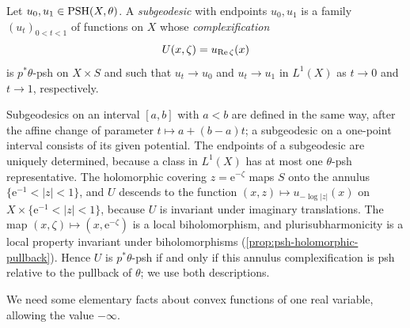 \begin{definition}\label{def:relative-subgeodesic}
Let $u_0,u_1\in\mathrm{PSH}(X,\theta)$. A \emph{subgeodesic} with endpoints $u_0,u_1$ is a family $(u_t)_{0<t<1}$ of functions on $X$ whose \emph{complexification}
\[
 U(x,\zeta)=u_{\operatorname{Re}\zeta}(x)
\]
is $p^*\theta$-psh on $X\times S$ and such that $u_t\to u_0$ and $u_t\to u_1$ in $L^1(X)$ as $t\to0$ and $t\to1$, respectively.
\end{definition}
Subgeodesics on an interval $[a,b]$ with $a<b$ are defined in the same way, after the affine change of parameter $t\mapsto a+(b-a)t$; a subgeodesic on a one-point interval consists of its given potential. The endpoints of a subgeodesic are uniquely determined, because a class in $L^1(X)$ has at most one $\theta$-psh representative. The holomorphic covering $z=\mathrm e^{-\zeta}$ maps $S$ onto the annulus $\{\mathrm e^{-1}<|z|<1\}$, and $U$ descends to the function $(x,z)\mapsto u_{-\log|z|}(x)$ on $X\times\{\mathrm e^{-1}<|z|<1\}$, because $U$ is invariant under imaginary translations. The map $(x,\zeta)\mapsto(x,\mathrm e^{-\zeta})$ is a local biholomorphism, and plurisubharmonicity is a local property invariant under biholomorphisms (\cref{prop:psh-holomorphic-pullback}). Hence $U$ is $p^*\theta$-psh if and only if this annulus complexification is psh relative to the pullback of $\theta$; we use both descriptions.

We need some elementary facts about convex functions of one real variable, allowing the value $-\infty$.


